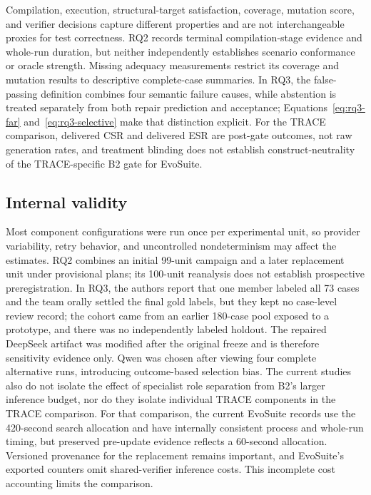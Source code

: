 \documentclass[pdflatex,sn-basic,Numbered,iicol]{sn-jnl}
\begin{document}
Compilation, execution, structural-target satisfaction, coverage, mutation score, and verifier decisions capture different properties and are not interchangeable proxies for test correctness. RQ2 records terminal compilation-stage evidence and whole-run duration, but neither independently establishes scenario conformance or oracle strength. Missing adequacy measurements restrict its coverage and mutation results to descriptive complete-case summaries. In RQ3, the false-passing definition combines four semantic failure causes, while abstention is treated separately from both repair prediction and acceptance; Equations~\ref{eq:rq3-far} and~\ref{eq:rq3-selective} make that distinction explicit. For the TRACE comparison, delivered CSR and delivered ESR are post-gate outcomes, not raw generation rates, and treatment blinding does not establish construct-neutrality of the TRACE-specific B2 gate for EvoSuite.

\subsection{Internal validity}

Most component configurations were run once per experimental unit, so provider variability, retry behavior, and uncontrolled nondeterminism may affect the estimates. RQ2 combines an initial 99-unit campaign and a later replacement unit under provisional plans; its 100-unit reanalysis does not establish prospective preregistration. In RQ3, the authors report that one member labeled all 73 cases and the team orally settled the final gold labels, but they kept no case-level review record; the cohort came from an earlier 180-case pool exposed to a prototype, and there was no independently labeled holdout. The repaired DeepSeek artifact was modified after the original freeze and is therefore sensitivity evidence only. Qwen was chosen after viewing four complete alternative runs, introducing outcome-based selection bias. The current studies also do not isolate the effect of specialist role separation from B2's larger inference budget, nor do they isolate individual TRACE components in the TRACE comparison. For that comparison, the current EvoSuite records use the 420-second search allocation and have internally consistent process and whole-run timing, but preserved pre-update evidence reflects a 60-second allocation. Versioned provenance for the replacement remains important, and EvoSuite's exported counters omit shared-verifier inference costs. This incomplete cost accounting limits the comparison.
\end{document}
